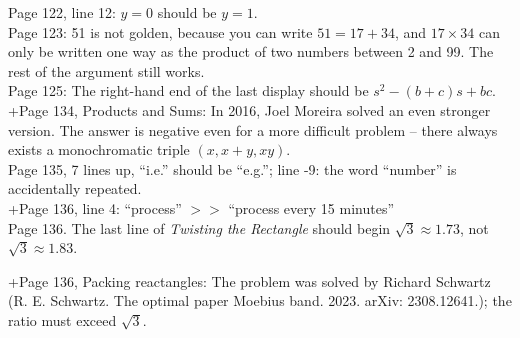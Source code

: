 \documentclass[11pt]{article}
\begin{document}
Page 122, line 12: $y=0$ should be $y=1$.\\

Page 123: 51 is not golden, because you can write $51=17+34$, and $17 \times 34$ can only be written one
way as the product of two numbers between 2 and 99.  The rest of the argument still works.\\

Page 125: The right-hand end of the last display should be $s^2-(b+c)s+bc$.\\

+Page 134, Products and Sums: In 2016, Joel Moreira solved an even stronger version. The answer is negative even for a more difficult problem – there always exists a monochromatic triple $ (x, x + y, xy)$.\\

Page 135, 7 lines up,  ``i.e.'' should be ``e.g.'';
line -9: the word ``number'' is accidentally repeated.\\

+Page 136, line 4: ``process'' $>>$ ``process every 15 minutes''\\

Page 136. The last line of {\em Twisting the Rectangle} should begin $\sqrt{3}\approx 1.73$, not
$\sqrt{3}\approx 1.83$.

+Page 136, Packing reactangles: The problem was solved by Richard Schwartz (R. E. Schwartz. The optimal paper Moebius band. 2023. arXiv: 2308.12641.); the ratio must exceed $\sqrt{3}$.\\
\end{document}
